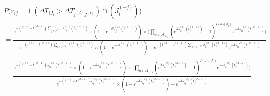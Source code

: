 \documentclass[a4paper]{article}
\begin{document}
   \begin{equation}
   	\begin{split}
   		&P\Big(r_{ij}=1|(\Delta T_{i{J_i}} > \Delta T_{i^{(d)}{J^{(d)}}})\cap( J_i^{(-j)})\Big)\\&=\frac{e^{-(t^{(d)}-t^{(d-1)})\sum\limits_{j \in J_i^{(+j)}}\lambda^{(d)}_{ij}(t_+^{(d-1)})}\times(1-e^{-\delta\lambda^{(d)}_{ij}(t_+^{(d-1)})})\times\Big(\prod_{a \in \mathcal{A}_{\backslash i, j}} (e^{\delta\lambda^{(d)}_{ia}(t_+^{(d-1)})}-1)^{I(a \in J_i)}e^{-\delta\lambda^{(d)}_{ia}(t_+^{(d-1)})}\Big)}{e^{-(t^{(d)}-t^{(d-1)})\sum\limits_{j \in J_i^{(+j)}}\lambda^{(d)}_{ij}(t_+^{(d-1)})}\times(1-e^{-\delta\lambda^{(d)}_{ij}(t_+^{(d-1)})})+e^{-(t^{(d)}-t^{(d-1)})\sum\limits_{j \in J_i^{(-j)}}\lambda^{(d)}_{ij}(t_+^{(d-1)})}e^{-\delta\lambda^{(d)}_{ij}(t_+^{(d-1)})}}\\
   		&=\frac{e^{-(t^{(d)}-t^{(d-1)})\lambda^{(d)}_{ij}(t_+^{(d-1)})}\times(1-e^{-\delta\lambda^{(d)}_{ij}(t_+^{(d-1)})})\times\Big(\prod_{a \in \mathcal{A}_{\backslash i, j}} (e^{\delta\lambda^{(d)}_{ia}(t_+^{(d-1)})}-1)^{I(a \in J_i)}e^{-\delta\lambda^{(d)}_{ia}(t_+^{(d-1)})}\Big)}{e^{-(t^{(d)}-t^{(d-1)})\lambda^{(d)}_{ij}(t_+^{(d-1)})}\times(1-e^{-\delta\lambda^{(d)}_{ij}(t_+^{(d-1)})})+e^{-\delta\lambda^{(d)}_{ij}(t_+^{(d-1)})}}.
   	\end{split}
   \end{equation}
\end{document}
